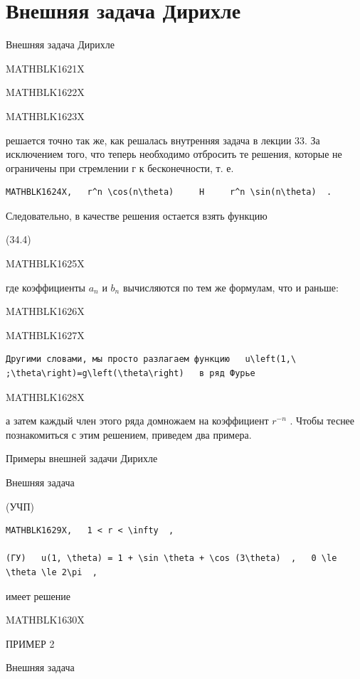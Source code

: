\documentclass[
]{article}
\begin{document}
{{{\section{Внешняя задача
Дирихле}\label{ux432ux43dux435ux448ux43dux44fux44f-ux437ux430ux434ux430ux447ux430-ux434ux438ux440ux438ux445ux43bux435}

Внешняя задача Дирихле

MATHBLK1621X

MATHBLK1622X

MATHBLK1623X

решается точно так же, как решалась внутренняя задача в лекции 33. За
исключением того, что теперь необходимо отбросить те решения, которые не
ограничены при стремлении г к бесконечности, т. е.

\begin{verbatim}
MATHBLK1624X,   r^n \cos(n\theta)     H     r^n \sin(n\theta)  .
\end{verbatim}

Следовательно, в качестве решения остается взять функцию

(34.4)

MATHBLK1625X

где коэффициенты \(a_n\) и \(b_n\) вычисляются по тем же формулам, что и
раньше:

MATHBLK1626X

MATHBLK1627X

\begin{verbatim}
Другими словами, мы просто разлагаем функцию   u\left(1,\ ;\theta\right)=g\left(\theta\right)   в ряд Фурье
\end{verbatim}

MATHBLK1628X

а затем каждый член этого ряда домножаем на коэффициент \(r^{-n}\) .
Чтобы теснее познакомиться с этим решением, приведем два примера.

Примеры внешней задачи Дирихле

Внешняя задача

(УЧП)

\begin{verbatim}
MATHBLK1629X,   1 < r < \infty  ,

(ГУ)   u(1, \theta) = 1 + \sin \theta + \cos (3\theta)  ,   0 \le \theta \le 2\pi  ,
\end{verbatim}

имеет решение

MATHBLK1630X

ПРИМЕР 2

Внешняя задача

}}}
\end{document}
